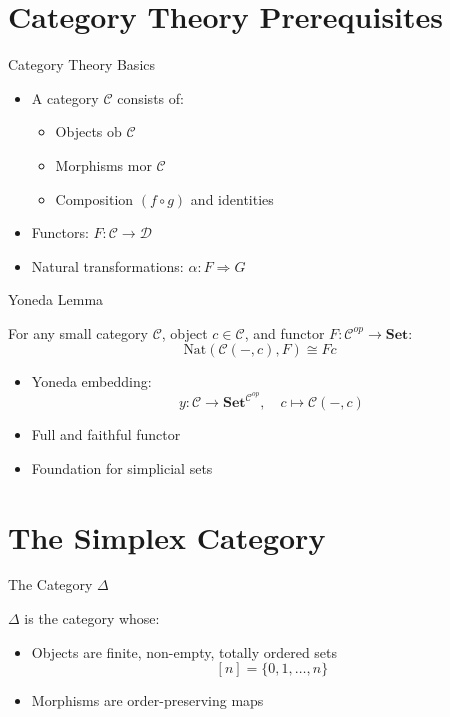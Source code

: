 \documentclass{beamer}
\begin{document}
\section{Category Theory Prerequisites}

\begin{frame}{Category Theory Basics}
  \begin{itemize}
    \item A category \(\mathcal{C}\) consists of:
      \begin{itemize}
        \item Objects \(\text{ob }\mathcal{C}\)
        \item Morphisms \(\text{mor }\mathcal{C}\)
        \item Composition \((f \circ g)\) and identities
      \end{itemize}
    \item Functors: \(F: \mathcal{C} \to \mathcal{D}\)
    \item Natural transformations: \(\alpha: F \Rightarrow G\)
  \end{itemize}
\end{frame}

\begin{frame}{Yoneda Lemma}
  \begin{theorem}
    For any small category \(\mathcal{C}\), object \(c \in \mathcal{C}\), and functor \(F: \mathcal{C}^{op} \to \mathbf{Set}\):
    \[
    \text{Nat}(\mathcal{C}(-, c), F) \cong Fc
    \]
  \end{theorem}
  \begin{itemize}
    \item Yoneda embedding:
      \[
      y: \mathcal{C} \to \mathbf{Set}^{\mathcal{C}^{op}}, \quad c \mapsto \mathcal{C}(-, c)
      \]
    \item Full and faithful functor
    \item Foundation for simplicial sets
  \end{itemize}
\end{frame}

\section{The Simplex Category}

\begin{frame}{The Category \(\Delta\)}
  \begin{definition}
    \(\Delta\) is the category whose:
    \begin{itemize}
      \item Objects are finite, non-empty, totally ordered sets
        \[
        [n] = \{0, 1, \ldots, n\}
        \]
      \item Morphisms are order-preserving maps
    \end{itemize}
  \end{definition}
\end{frame}
\end{document}
